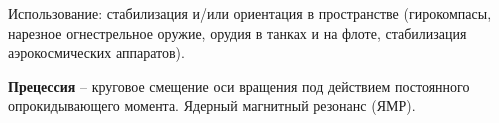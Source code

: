 Использование: стабилизация и/или ориентация в пространстве (ги\-ро\-компасы, нарезное огнестрельное оружие, орудия в танках и на флоте, ста\-би\-ли\-зация аэрокосмических аппаратов).

{\bf Прецессия} -- круговое смещение оси вращения под действием посто\-ян\-ного опрокидывающего момента. Ядерный магнитный резонанс (ЯМР).

